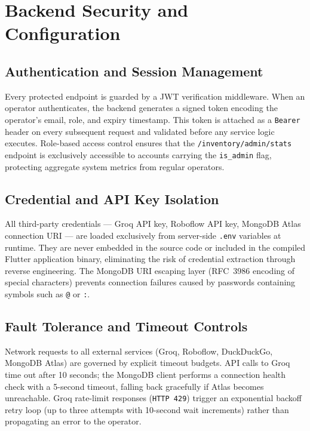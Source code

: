 \section{Backend Security and Configuration}
\label{sec:ch4-security}

\subsection{Authentication and Session Management}

Every protected endpoint is guarded by a JWT verification middleware. When an operator authenticates, the backend generates a signed token encoding the operator's email, role, and expiry timestamp. This token is attached as a \texttt{Bearer} header on every subsequent request and validated before any service logic executes. Role-based access control ensures that the \texttt{/inventory/admin/stats} endpoint is exclusively accessible to accounts carrying the \texttt{is\_admin} flag, protecting aggregate system metrics from regular operators.

\subsection{Credential and API Key Isolation}

All third-party credentials — Groq API key, Roboflow API key, MongoDB Atlas connection URI — are loaded exclusively from server-side \texttt{.env} variables at runtime. They are never embedded in the source code or included in the compiled Flutter application binary, eliminating the risk of credential extraction through reverse engineering. The MongoDB URI escaping layer (RFC~3986 encoding of special characters) prevents connection failures caused by passwords containing symbols such as \texttt{@} or \texttt{:}.

\subsection{Fault Tolerance and Timeout Controls}

Network requests to all external services (Groq, Roboflow, DuckDuckGo, MongoDB Atlas) are governed by explicit timeout budgets. API calls to Groq time out after 10 seconds; the MongoDB client performs a connection health check with a 5-second timeout, falling back gracefully if Atlas becomes unreachable. Groq rate-limit responses (\texttt{HTTP 429}) trigger an exponential backoff retry loop (up to three attempts with 10-second wait increments) rather than propagating an error to the operator.

